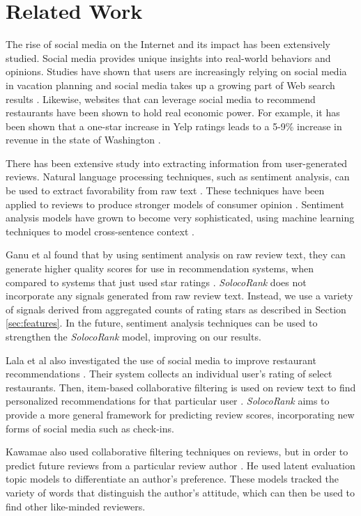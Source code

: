  \section{Related Work}
\label{sec:related}
The rise of social media on the Internet and its impact has been extensively studied.
Social media provides unique insights into real-world behaviors and opinions.
Studies have shown that users are increasingly relying on social media
in vacation planning and social media takes up a growing part of Web search results \cite{xiang2010}.
Likewise, websites that can leverage social media to recommend restaurants
have been shown to hold real economic power.
For example, it has been shown that a one-star increase in Yelp ratings
leads to a 5-9\% increase in revenue in the state of Washington \cite{luca2011reviews}.

There has been extensive study into extracting information from user-generated reviews.
Natural language processing techniques, such as sentiment analysis, 
can be used to extract favorability from raw text \cite{dave2003,nasukawa2003}.
These techniques have been applied to reviews to produce stronger models 
of consumer opinion \cite{carrillo2011,shamshurin,morinaga2002}.
Sentiment analysis models have grown to become very sophisticated, using machine learning
techniques to model cross-sentence context \cite{Pang:2004:SES:1218955.1218990}.

Ganu et al found that by using sentiment analysis on raw review text,
they can generate higher quality scores for use in recommendation systems,
when compared to systems that just used star ratings \cite{ganu2009}.
\emph{SolocoRank} does not incorporate any signals generated from raw review text.
Instead, we use a variety of signals derived from aggregated counts of rating stars
as described in Section \ref{sec:features}.
In the future, sentiment analysis techniques can be used to strengthen the
\emph{SolocoRank} model, improving on our results. 

Lala et al also investigated the use of social media to improve
restaurant recommendations \cite{lalamine}.
Their system collects an individual user's rating of select restaurants.
Then, item-based collaborative filtering is used on review text 
to find personalized recommendations for that particular user \cite{sarwar2001}.
\emph{SolocoRank} aims to provide a more general framework for predicting 
review scores, incorporating new forms of social media such as check-ins.

Kawamae also used collaborative filtering techniques on reviews,
but in order to predict future reviews from a particular review author \cite{kawamae2011}.
He used latent evaluation topic models to differentiate an author's preference.
These models tracked the variety of words that distinguish the author's
attitude, which can then be used to find other like-minded reviewers.

